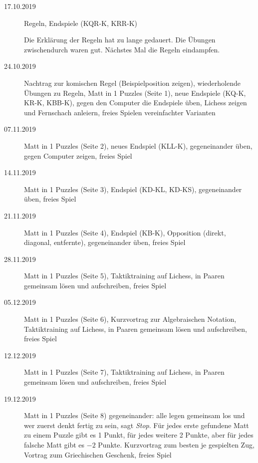 \documentclass[
  a4paper,
  justified,
  nobib,
]{tufte-handout}
\begin{document}
\begin{description}
  \item[17.10.2019] Regeln, Endspiele (KQR-K, KRR-K)

    Die Erklärung der Regeln hat zu lange gedauert.
    Die Übungen zwischendurch waren gut.
    Nächstes Mal die Regeln eindampfen.

  \item[24.10.2019] Nachtrag zur komischen Regel (Beispielposition zeigen),
    wiederholende Übungen zu Regeln,
    Matt in 1 Puzzles (Seite 1),
    neue Endspiele (KQ-K, KR-K, KBB-K),
    gegen den Computer die Endspiele üben,
    Lichess zeigen und Fernschach anleiern,
    freies Spielen vereinfachter Varianten

  \item[07.11.2019] Matt in 1 Puzzles (Seite 2),
    neues Endspiel (KLL-K),
    gegeneinander üben,
    gegen Computer zeigen,
    freies Spiel

  \item[14.11.2019] Matt in 1 Puzzles (Seite 3),
    Endspiel (KD-KL, KD-KS),
    gegeneinander üben,
    freies Spiel

  \item[21.11.2019] Matt in 1 Puzzles (Seite 4),
    Endspiel (KB-K),
    Opposition (direkt, diagonal, entfernte),
    gegeneinander üben,
    freies Spiel

  \item[28.11.2019] Matt in 1 Puzzles (Seite 5),
    Taktiktraining auf Lichess,
    in Paaren gemeinsam lösen und aufschreiben,
    freies Spiel

  \item[05.12.2019] Matt in 1 Puzzles (Seite 6),
    Kurzvortrag zur Algebraischen Notation,
    Taktiktraining auf Lichess,
    in Paaren gemeinsam lösen und aufschreiben,
    freies Spiel

  \item[12.12.2019] Matt in 1 Puzzles (Seite 7),
    Taktiktraining auf Lichess,
    in Paaren gemeinsam lösen und aufschreiben,
    freies Spiel

  \item[19.12.2019] Matt in 1 Puzzles (Seite 8) gegeneinander: alle legen gemeinsam los
    und wer zuerst denkt fertig zu sein, sagt \emph{Stop}. Für jedes erste gefundene Matt
    zu einem Puzzle gibt es 1 Punkt, für jedes weitere 2 Punkte, aber für jedes falsche
    Matt gibt es $-2$ Punkte.
    Kurzvortrag zum besten je gespielten Zug,
    Vortrag zum Griechischen Geschenk,
    freies Spiel


\end{description}
\end{document}
